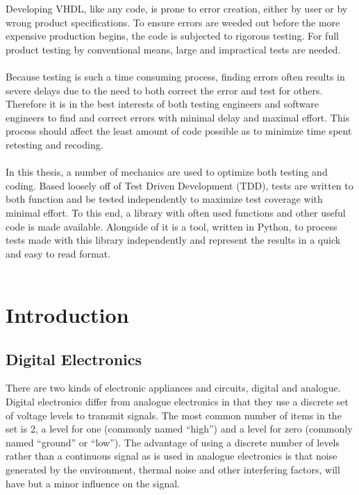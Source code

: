 \documentclass[11pt,british]{article}
\begin{document}
Developing VHDL, like any code, is prone to error creation, either
by user or by wrong product specifications. To ensure errors are weeded
out before the more expensive production begins, the code is subjected
to rigorous testing. For full product testing by conventional means,
large and impractical tests are needed.
\\
\\
Because testing is such a time consuming process, finding errors often
results in severe delays due to the need to both correct the error
and test for others. Therefore it is in the best interests of both
testing engineers and software engineers to find and correct errors
with minimal delay and maximal effort. This process should affect
the least amount of code possible as to minimize time spent retesting
and recoding.
\\
\\
In this thesis, a number of mechanics are used to optimize both testing
and coding. Based loosely off of Test Driven Development (TDD), tests
are written to both function and be tested independently to maximize
test coverage with minimal effort. To this end, a library with often
used functions and other useful code is made available. Alongside
of it is a tool, written in Python, to process tests made with this
library independently and represent the results in a quick and easy
to read format.
\\
\\


\newpage{}


\section{Introduction}


\subsection{Digital Electronics}

There are two kinds of electronic appliances and circuits, digital
and analogue. Digital electronics differ from analogue electronics
in that they use a discrete set of voltage levels to transmit signals.
The most common number of items in the set is 2, a level for one (commonly
named ``high'') and a level for zero (commonly named ``ground''
or ``low''). The advantage of using a discrete number of levels
rather than a continuous signal as is used in analogue electronics
is that noise generated by the environment, thermal noise and other
interfering factors, will have but a minor influence on the signal.\\
\end{document}
